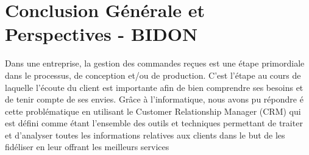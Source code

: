 \chapter{Conclusion Générale et Perspectives - BIDON}
\pagestyle{fancy}
\fancyhf{}
\fancyhead[R]{\bfseries\rightmark}
\fancyfoot[R]{\thepage}
\renewcommand{\headrulewidth}{0.5pt}
\renewcommand{\footrulewidth}{0pt}
\renewcommand{\chaptermark}[1]{\markboth{\MakeUppercase{\chaptername~\thechapter. #1 }}{}}
\renewcommand{\sectionmark}[1]{\markright{\thechapter.\thesection~ #1}}

\begin{spacing}{1.5}

Dans une entreprise, la gestion des commandes reçues est une étape primordiale dans le processus, de conception et/ou de production. C'est l'étape au cours de laquelle l'écoute du client est importante afin de bien comprendre ses besoins et de tenir compte de ses envies. Grâce à l'informatique, nous avons  pu répondre é cette problématique en utilisant le Customer Relationship Manager (CRM) qui est défini comme étant l'ensemble des outils et techniques permettant de traiter et d'analyser toutes les informations relatives aux clients dans le but de les fidéliser en leur offrant les meilleurs services


\end{spacing}
